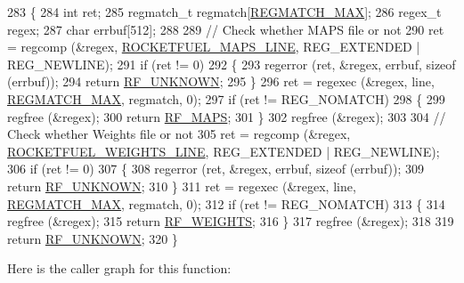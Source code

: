 \begin{DoxyCode}
283 \{
284   \textcolor{keywordtype}{int} ret;
285   regmatch\_t regmatch[\hyperlink{rocketfuel-topology-reader_8cc_a6060444660288a903075761dcfcb32d3}{REGMATCH\_MAX}];
286   regex\_t regex;
287   \textcolor{keywordtype}{char} errbuf[512];
288 
289   \textcolor{comment}{// Check whether MAPS file or not}
290   ret = regcomp (&regex, \hyperlink{rocketfuel-topology-reader_8cc_a158bb886cca27e42e534b4a16a6a4f35}{ROCKETFUEL\_MAPS\_LINE}, REG\_EXTENDED | REG\_NEWLINE);
291   \textcolor{keywordflow}{if} (ret != 0)
292     \{
293       regerror (ret, &regex, errbuf, \textcolor{keyword}{sizeof} (errbuf));
294       \textcolor{keywordflow}{return} \hyperlink{classns3_1_1RocketfuelTopologyReader_a04346285f097be349a70c57315a42415abcd0ab0e192c64ebc7684980f7455ec4}{RF\_UNKNOWN};
295     \}
296   ret = regexec (&regex, line, \hyperlink{rocketfuel-topology-reader_8cc_a6060444660288a903075761dcfcb32d3}{REGMATCH\_MAX}, regmatch, 0);
297   \textcolor{keywordflow}{if} (ret != REG\_NOMATCH)
298     \{
299       regfree (&regex);
300       \textcolor{keywordflow}{return} \hyperlink{classns3_1_1RocketfuelTopologyReader_a04346285f097be349a70c57315a42415a845bfbcfcea49def2cce65b5e9c0c2f5}{RF\_MAPS};
301     \}
302   regfree (&regex);
303 
304   \textcolor{comment}{// Check whether Weights file or not}
305   ret = regcomp (&regex, \hyperlink{rocketfuel-topology-reader_8cc_a3bc3a698d16d454a03f538d762f6a295}{ROCKETFUEL\_WEIGHTS\_LINE}, REG\_EXTENDED | REG\_NEWLINE);
306   \textcolor{keywordflow}{if} (ret != 0)
307     \{
308       regerror (ret, &regex, errbuf, \textcolor{keyword}{sizeof} (errbuf));
309       \textcolor{keywordflow}{return} \hyperlink{classns3_1_1RocketfuelTopologyReader_a04346285f097be349a70c57315a42415abcd0ab0e192c64ebc7684980f7455ec4}{RF\_UNKNOWN};
310     \}
311   ret = regexec (&regex, line, \hyperlink{rocketfuel-topology-reader_8cc_a6060444660288a903075761dcfcb32d3}{REGMATCH\_MAX}, regmatch, 0);
312   \textcolor{keywordflow}{if} (ret != REG\_NOMATCH)
313     \{
314       regfree (&regex);
315       \textcolor{keywordflow}{return} \hyperlink{classns3_1_1RocketfuelTopologyReader_a04346285f097be349a70c57315a42415abed804021a51dbea02727a00544cbb75}{RF\_WEIGHTS};
316     \}
317   regfree (&regex);
318 
319   \textcolor{keywordflow}{return} \hyperlink{classns3_1_1RocketfuelTopologyReader_a04346285f097be349a70c57315a42415abcd0ab0e192c64ebc7684980f7455ec4}{RF\_UNKNOWN};
320 \}
\end{DoxyCode}


Here is the caller graph for this function\+:


